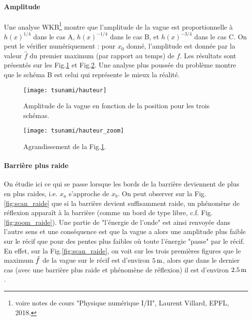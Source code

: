 \documentclass[a4paper,12pt,oneside]{article}
\begin{document}
\paragraph{Amplitude}
Une analyse WKB\footnote{voire notes de cours "Physique numérique I/II", Laurent Villard, EPFL, 2018.} montre que l'amplitude de la vague est proportionnelle à $h(x)^{1/4}$ dans le cas A, $h(x)^{-1/4}$ dans le cas B, et $h(x)^{-3/4}$ dans le cas C. On peut le vérifier numériquement : pour $x_0$ donné, l'amplitude est donnée par la valeur $\hat{f}$ du premier maximum (par rapport au temps) de $f$. Les résultats sont présentés sur les Fig.\ref{fig:hauteur} et Fig.\ref{fig:hauteur_zoom}. Une analyse plus poussée du problème montre que le schéma B est celui qui représente le mieux la réalité. 



\begin{figure}[H]
    \centering
    \texttt{[image: tsunami/hauteur]}
    \caption{Amplitude de la vague en fonction de la position pour les trois schémas.}
    \label{fig:hauteur}
\end{figure}

\begin{figure}[H]
    \centering
    \texttt{[image: tsunami/hauteur\_zoom]}
    \caption{Agrandissement de la Fig.\ref{fig:hauteur}.}
    \label{fig:hauteur_zoom}
\end{figure}

\paragraph{Barrière plus raide} On étudie ici ce qui se passe lorsque les bords de la barrière deviennent de plus en plus raides, i.e. $x_a$ s'approche de $x_b$. On peut observer sur la Fig.\ref{fig:scan_raide} que si la barrière devient suffisamment raide, un phénomène de réflexion apparaît à la barrière (comme un bord de type libre, c.f. Fig.\ref{fig:zoom_raide}). Une partie de "l'énergie de l'onde" est ainsi renvoyée dans l'autre sens et une conséquence est que la vague a alors une amplitude plus faible sur le récif que pour des pentes plus faibles où toute l'énergie "passe" par le récif. En effet, sur la Fig.\ref{fig:scan_raide}, on voit sur les trois premières figures que le maximum $\Hat{f}$ de la vague sur le récif est d'environ $5\, \rm m$, alors que dans le dernier cas (avec une barrière plus raide et phénomène de réflexion) il est d'environ $2.5\, \rm m$. 
\end{document}
